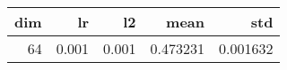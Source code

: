 \begin{tabular}{rrrrr}
\toprule
 dim &     lr &     l2 &      mean &       std \\
\midrule
  64 &  0.001 &  0.001 &  0.473231 &  0.001632 \\
\bottomrule
\end{tabular}
